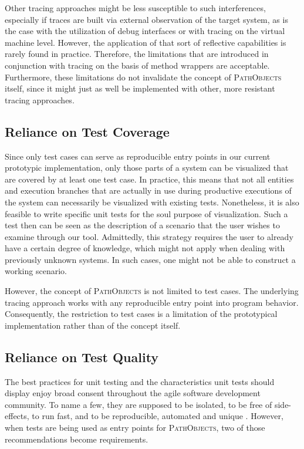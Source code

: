 Other tracing approaches might be less susceptible to such interferences, especially if traces are built via external observation of the target system, as is the case with the utilization of debug interfaces or with tracing on the virtual machine level.
However, the application of that sort of reflective capabilities is rarely found in practice.
Therefore, the limitations that are introduced in conjunction with tracing on the basis of method wrappers are acceptable.
Furthermore, these limitations do not invalidate the concept of \textsc{PathObjects} itself, since it might just as well be implemented with other, more resistant tracing approaches.

\subsection{Reliance on Test Coverage}
\label{ss:DiscussionLimitationsCoverage}
Since only test cases can serve as reproducible entry points in our current prototypic implementation, only those parts of a system can be visualized that are covered by at least one test case.
In practice, this means that not all entities and execution branches that are actually in use during productive executions of the system can necessarily be visualized with existing tests.
Nonetheless, it is also feasible to write specific unit tests for the soul purpose of visualization.
Such a test then can be seen as the description of a scenario that the user wishes to examine through our tool.
Admittedly, this strategy requires the user to already have a certain degree of knowledge, which might not apply when dealing with previously unknown systems.
In such cases, one might not be able to construct a working scenario.

However, the concept of \textsc{PathObjects} is not limited to test cases.
The underlying tracing approach works with any reproducible entry point into program behavior.
Consequently, the restriction to test cases is a limitation of the prototypical implementation rather than of the concept itself.

\subsection{Reliance on Test Quality} 
\label{ss:DiscussionLimitationsTestQuality}
The best practices for unit testing and the characteristics unit tests should display enjoy broad consent throughout the agile software development community.
To name a few, they are supposed to be isolated, to be free of side-effects, to run fast, and to be reproducible, automated and unique \cite{meszaros_xunit_2006, beck_test_2002}.
However, when tests are being used as entry points for \textsc{PathObjects}, two of those recommendations become requirements.

